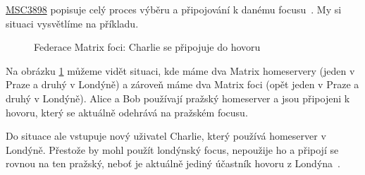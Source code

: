 \href{https://github.com/matrix-org/matrix-spec-proposals/pull/3898}{MSC3898}
popisuje celý proces výběru a připojování k danému focusu~\parencite{GitHub-MSC3898}.
My si situaci vysvětlíme na příkladu.

\begin{figure}[H]
    \centering
    \caption{Federace Matrix foci: Charlie se připojuje do hovoru}
    \label{focusSelection1}
\end{figure}

Na obrázku \ref{focusSelection1} můžeme vidět situaci, kde máme dva Matrix
homeservery (jeden v Praze a druhý v Londýně) a zároveň máme dva Matrix foci
(opět jeden v Praze a druhý v Londýně). Alice a Bob používají pražský homeserver
a jsou připojeni k hovoru, který se aktuálně odehrává na pražském focusu.

Do situace ale vstupuje nový uživatel Charlie, který používá homeserver v
Londýně. Přestože by mohl použít londýnský focus, nepoužije ho a připojí se
rovnou na ten pražský, neboť je aktuálně jediný účastník hovoru z
Londýna~\parencite{GitHub-MSC3898}.

